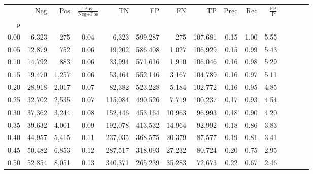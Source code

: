\begin{tabular}{rrrcrrrrrrrrrrr}
\toprule
{} &     Neg &     Pos & $\frac{\text{Pos}}{\text{Neg}+\text{Pos}}$ &       TN &       FP &       FN &       TP &  Prec &   Rec & $\frac{\text{FP}}{\text{P}}$ \\
p    &         &         &                                            &          &          &          &          &       &       &                              \\
\midrule
0.00 &   6,323 &     275 &                                       0.04 &    6,323 &  599,287 &      275 &  107,681 &  0.15 &  1.00 &                         5.55 \\
0.05 &  12,879 &     752 &                                       0.06 &   19,202 &  586,408 &    1,027 &  106,929 &  0.15 &  0.99 &                         5.43 \\
0.10 &  14,792 &     883 &                                       0.06 &   33,994 &  571,616 &    1,910 &  106,046 &  0.16 &  0.98 &                         5.29 \\
0.15 &  19,470 &   1,257 &                                       0.06 &   53,464 &  552,146 &    3,167 &  104,789 &  0.16 &  0.97 &                         5.11 \\
0.20 &  28,918 &   2,017 &                                       0.07 &   82,382 &  523,228 &    5,184 &  102,772 &  0.16 &  0.95 &                         4.85 \\
0.25 &  32,702 &   2,535 &                                       0.07 &  115,084 &  490,526 &    7,719 &  100,237 &  0.17 &  0.93 &                         4.54 \\
0.30 &  37,362 &   3,244 &                                       0.08 &  152,446 &  453,164 &   10,963 &   96,993 &  0.18 &  0.90 &                         4.20 \\
0.35 &  39,632 &   4,001 &                                       0.09 &  192,078 &  413,532 &   14,964 &   92,992 &  0.18 &  0.86 &                         3.83 \\
0.40 &  44,957 &   5,415 &                                       0.11 &  237,035 &  368,575 &   20,379 &   87,577 &  0.19 &  0.81 &                         3.41 \\
0.45 &  50,482 &   6,853 &                                       0.12 &  287,517 &  318,093 &   27,232 &   80,724 &  0.20 &  0.75 &                         2.95 \\
0.50 &  52,854 &   8,051 &                                       0.13 &  340,371 &  265,239 &   35,283 &   72,673 &  0.22 &  0.67 &                         2.46 \\

\end{tabular}
